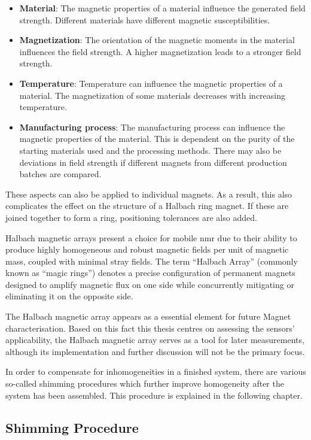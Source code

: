 \begin{itemize}
\item
  \textbf{Material}: The magnetic properties of a material influence the
  generated field strength. Different materials have different magnetic
  susceptibilities.
\item
  \textbf{Magnetization}: The orientation of the magnetic moments in the
  material influences the field strength. A higher magnetization leads
  to a stronger field strength.
\item
  \textbf{Temperature}: Temperature can influence the magnetic
  properties of a material. The magnetization of some materials
  decreases with increasing temperature.
\item
  \textbf{Manufacturing process}: The manufacturing process can
  influence the magnetic properties of the material. This is dependent
  on the purity of the starting materials used and the processing
  methods. There may also be deviations in field strength if different
  magnets from different production batches are compared.
  \cite{inbook}
\end{itemize}

These aspects can also be applied to individual magnets. As a result,
this also complicates the effect on the structure of a Halbach ring
magnet. If these are joined together to form a ring, positioning
tolerances are also added.

Halbach magnetic arrays present a choice for mobile \gls{nmr} due to
their ability to produce highly homogeneous and robust magnetic fields
per unit of magnetic mass, coupled with minimal stray fields. The term
``Halbach Array'' (commonly known as ``magic rings'') denotes a precise
configuration of permanent magnets designed to amplify magnetic flux on
one side while concurrently mitigating or eliminating it on the opposite
side. \cite{inbook}

The Halbach magnetic array appears as a essential element for future
Magnet characterisation. Based on this fact this thesis centres on
assessing the sensors' applicability, the Halbach magnetic array serves
as a tool for later measurements, although its implementation and
further discussion will not be the primary focus.

In order to compensate for inhomogeneities in a finished system, there
are various so-called shimming procedures which further improve
homogeneity after the system has been assembled. This procedure is
explained in the following chapter.

\hypertarget{shimming-procedure}{%
\subsection{Shimming Procedure}\label{shimming-procedure}}

